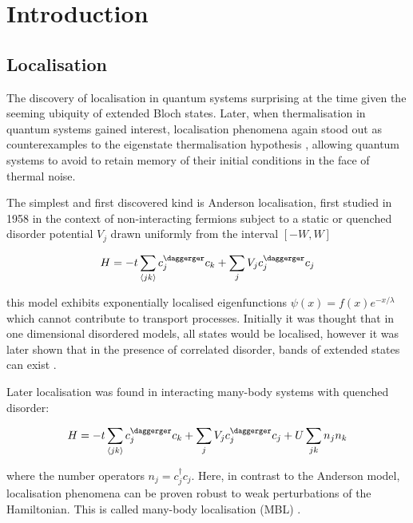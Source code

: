 \begin{Shaded}
\begin{Highlighting}[]
\OperatorTok{\%\%}
\end{Highlighting}
\end{Shaded}

\hypertarget{introduction}{%
\section{Introduction}\label{introduction}}

\hypertarget{localisation}{%
\subsection{Localisation}\label{localisation}}

The discovery of localisation in quantum systems surprising at the time
given the seeming ubiquity of extended Bloch states. Later, when
thermalisation in quantum systems gained interest, localisation
phenomena again stood out as counterexamples to the eigenstate
thermalisation hypothesis
\autocite{abanin_recent_2017,srednicki_chaos_1994}, allowing quantum
systems to avoid to retain memory of their initial conditions in the
face of thermal noise.

The simplest and first discovered kind is Anderson localisation, first
studied in 1958 \textcite{anderson_absence_1958-1} in the context of
non-interacting fermions subject to a static or quenched disorder
potential \(V_j\) drawn uniformly from the interval \([-W,W]\)

\[
H = -t\sum_{\langle jk \rangle} c^\daggerger_j c_k + \sum_j V_j c_j^\daggerger c_j
\]

this model exhibits exponentially localised eigenfunctions
\(\psi(x) = f(x) e^{-x/\lambda}\) which cannot contribute to transport
processes. Initially it was thought that in one dimensional disordered
models, all states would be localised, however it was later shown that
in the presence of correlated disorder, bands of extended states can
exist
\autocite{izrailev_localization_1999,croy_anderson_2011,izrailev_anomalous_2012}.

Later localisation was found in interacting many-body systems with
quenched disorder:

\[
H = -t\sum_{\langle jk \rangle} c^\daggerger_j c_k + \sum_j V_j c_j^\daggerger c_j + U\sum_{jk} n_j n_k
\]

where the number operators \(n_j = c^\dagger_j c_j\). Here, in contrast
to the Anderson model, localisation phenomena can be proven robust to
weak perturbations of the Hamiltonian. This is called many-body
localisation (MBL) \textcite{imbrie_many-body_2016}.


